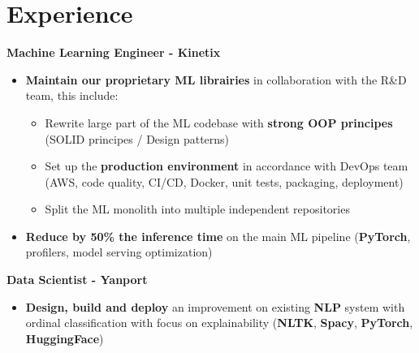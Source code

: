\documentclass[a4paper,10pt]{article}
\begin{document}
\begin{adjustbox}{valign=t}
    \begin{minipage}{0.6\textwidth}
        \vspace{1cm}
        \section*{Experience}
        \vspace{-.3cm}
        \begin{description}
            \raggedright
            \item[\normalfont \textcolor{ColorOne}{Since Oct. 2022}]
                \textbf{Machine Learning Engineer - Kinetix}\\
                \small
                \begin{itemize}[topsep=0pt]
                    \item \textbf{Maintain our proprietary ML librairies} in collaboration with the R\&D team, this include:
                    \begin{itemize}[topsep=0pt]
                        \item Rewrite large part of the ML codebase with \textbf{strong OOP principes} (SOLID principes / Design patterns)
                        \item Set up the \textbf{production environment} in accordance with DevOps team (AWS, code quality, CI/CD, Docker, unit tests, packaging, deployment)
                        \item Split the ML monolith into multiple independent repositories
                    \end{itemize}
                    \item \textbf{Reduce by 50\% the inference time} on the main ML pipeline (\textbf{PyTorch}, profilers, model serving optimization)
                \end{itemize}
                \normalsize
            \item[\normalfont \textcolor{ColorOne}{Sep. 2021 -- Sep. 2022}]
                \textbf{Data Scientist - Yanport}\\
                \small
                \begin{itemize}[topsep=0pt]
                    \item \textbf{Design, build and deploy} an improvement on existing \textbf{NLP} system with ordinal classification with focus on explainability (\textbf{NLTK}, \textbf{Spacy}, \textbf{PyTorch}, \textbf{HuggingFace})

\end{itemize}
\end{description}
\end{minipage}
\end{adjustbox}
\end{document}
